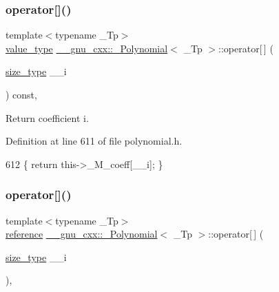 \subsubsection{\texorpdfstring{operator[]()}{operator[]()}\hspace{0.1cm}{\footnotesize\ttfamily [1/2]}}
{\footnotesize\ttfamily template$<$typename \+\_\+\+Tp$>$ \\
\hyperlink{class____gnu__cxx_1_1__Polynomial_a725563351f50e76084a7a016c06f8a53}{value\+\_\+type} \hyperlink{class____gnu__cxx_1_1__Polynomial}{\+\_\+\+\_\+gnu\+\_\+cxx\+::\+\_\+\+Polynomial}$<$ \+\_\+\+Tp $>$\+::operator\mbox{[}$\,$\mbox{]} (\begin{DoxyParamCaption}\item[{\hyperlink{class____gnu__cxx_1_1__Polynomial_a6afe219c123c7a2fdc5abac8a6639053}{size\+\_\+type}}]{\+\_\+\+\_\+i }\end{DoxyParamCaption}) const\hspace{0.3cm}{\ttfamily [inline]}, {\ttfamily [noexcept]}}

Return coefficient {\ttfamily i}. 

Definition at line 611 of file polynomial.\+h.


\begin{DoxyCode}
612       \{ \textcolor{keywordflow}{return} this->\_M\_coeff[\_\_i]; \}
\end{DoxyCode}
\mbox{\label{class____gnu__cxx_1_1__Polynomial_a999ee3c5a82fe4b2fa39b7a237ff2cbf}} 
\subsubsection{\texorpdfstring{operator[]()}{operator[]()}\hspace{0.1cm}{\footnotesize\ttfamily [2/2]}}
{\footnotesize\ttfamily template$<$typename \+\_\+\+Tp$>$ \\
\hyperlink{class____gnu__cxx_1_1__Polynomial_accb3b4df60e4ad82d466173d54ea731a}{reference} \hyperlink{class____gnu__cxx_1_1__Polynomial}{\+\_\+\+\_\+gnu\+\_\+cxx\+::\+\_\+\+Polynomial}$<$ \+\_\+\+Tp $>$\+::operator\mbox{[}$\,$\mbox{]} (\begin{DoxyParamCaption}\item[{\hyperlink{class____gnu__cxx_1_1__Polynomial_a6afe219c123c7a2fdc5abac8a6639053}{size\+\_\+type}}]{\+\_\+\+\_\+i }\end{DoxyParamCaption})\hspace{0.3cm}{\ttfamily [inline]}, {\ttfamily [noexcept]}}

